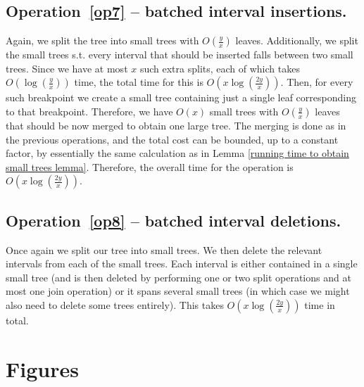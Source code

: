 \documentclass[a4paper,UKenglish]{lipics-v2016}
\theoremstyle{plain}
\begin{document}
\subsection{\bf Operation~\ref{op7} -- batched interval insertions.}
Again, we split the tree into small trees with $O(\frac{y}{x})$ leaves. Additionally, we split the small trees s.t. every interval
that should be inserted falls between two small trees.
Since we have at most $x$ such extra splits, each of which takes $O(\log(\frac{y}{x}))$ time, the total time for this is $O(x\log(\frac{2y}{x}))$.
Then, for every such breakpoint we create a small tree containing just a single leaf corresponding to that
breakpoint. Therefore, we have $O(x)$ small trees with $O(\frac{y}{x})$ leaves that should be now merged
to obtain one large tree.
The merging is done as in the previous operations, and the total cost can be bounded,
up to a constant factor, by essentially the same calculation as in Lemma \ref{running time to obtain small trees lemma}. Therefore, the overall time for the operation is $O(x \log(\frac{2y}{x}))$.

\subsection{\bf Operation~\ref{op8} -- batched interval deletions.}
Once again we split our tree into small trees. We then delete the relevant intervals from each of the small trees. Each interval is either contained in a single small tree (and is then deleted by performing one or two split operations and at most one join operation) or it spans several small trees (in which case we might also need to delete some trees entirely). This takes $O(x \log(\frac{2y}{x}))$ time in total.

\section{Figures}
\end{document}
